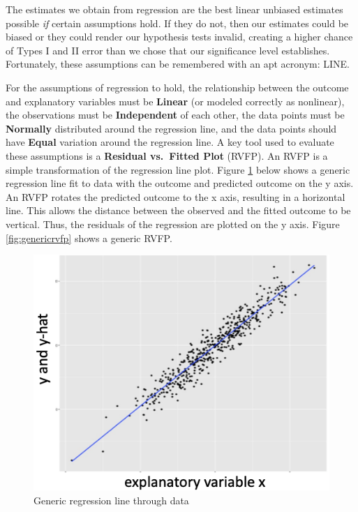 \documentclass[
]{book}
\begin{document}
The estimates we obtain from regression are the best linear unbiased estimates possible \emph{if} certain assumptions hold. If they do not, then our estimates could be biased or they could render our hypothesis tests invalid, creating a higher chance of Types I and II error than we chose that our significance level establishes. Fortunately, these assumptions can be remembered with an apt acronym: LINE.

For the assumptions of regression to hold, the relationship between the outcome and explanatory variables must be \textbf{Linear} (or modeled correctly as nonlinear), the observations must be \textbf{Independent} of each other, the data points must be \textbf{Normally} distributed around the regression line, and the data points should have \textbf{Equal} variation around the regression line. A key tool used to evaluate these assumptions is a \textbf{Residual vs.~Fitted Plot} (RVFP). An RVFP is a simple transformation of the regression line plot. Figure \ref{fig:genericreg} below shows a generic regression line fit to data with the outcome and predicted outcome on the y axis. An RVFP rotates the predicted outcome to the x axis, resulting in a horizontal line. This allows the distance between the observed and the fitted outcome to be vertical. Thus, the residuals of the regression are plotted on the y axis. Figure \ref{fig:genericrvfp} shows a generic RVFP.

\begin{figure}

{\centering \includegraphics[width=\textwidth]{images/genericreg} 

}

\caption{Generic regression line through data}\label{fig:genericreg}
\end{figure}
\end{document}
